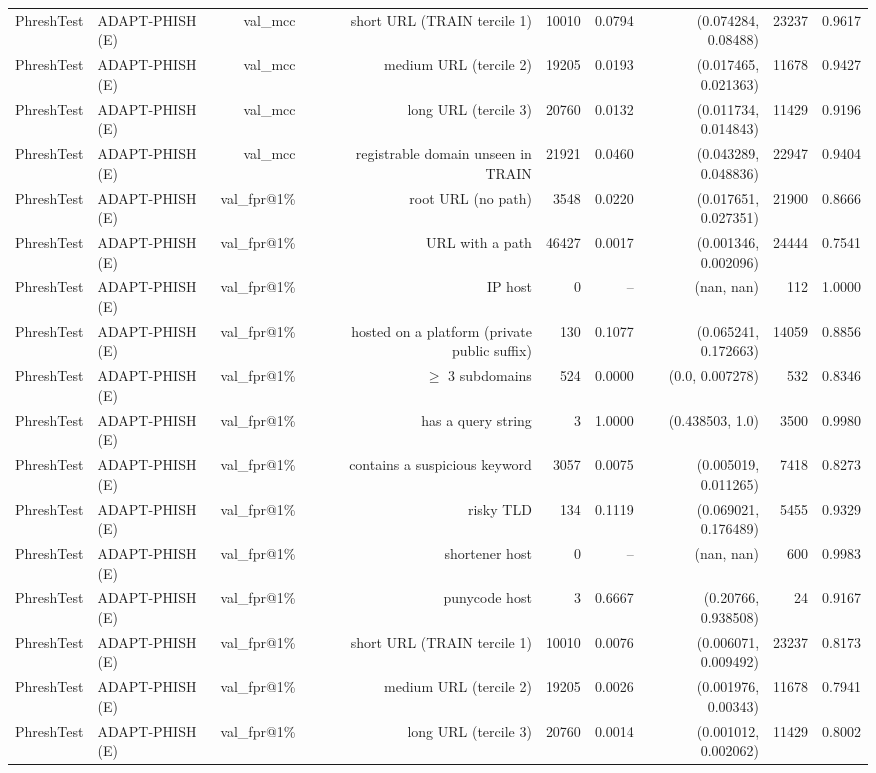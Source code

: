 \begin{table}[t]
\begin{tabular}{llrrrrrrr}
PhreshTest & ADAPT-PHISH (E) & val\_mcc & short URL (TRAIN tercile 1) & 10010 & 0.0794 & (0.074284, 0.08488) & 23237 & 0.9617 \\
PhreshTest & ADAPT-PHISH (E) & val\_mcc & medium URL (tercile 2) & 19205 & 0.0193 & (0.017465, 0.021363) & 11678 & 0.9427 \\
PhreshTest & ADAPT-PHISH (E) & val\_mcc & long URL (tercile 3) & 20760 & 0.0132 & (0.011734, 0.014843) & 11429 & 0.9196 \\
PhreshTest & ADAPT-PHISH (E) & val\_mcc & registrable domain unseen in TRAIN & 21921 & 0.0460 & (0.043289, 0.048836) & 22947 & 0.9404 \\
PhreshTest & ADAPT-PHISH (E) & val\_fpr@1\% & root URL (no path) & 3548 & 0.0220 & (0.017651, 0.027351) & 21900 & 0.8666 \\
PhreshTest & ADAPT-PHISH (E) & val\_fpr@1\% & URL with a path & 46427 & 0.0017 & (0.001346, 0.002096) & 24444 & 0.7541 \\
PhreshTest & ADAPT-PHISH (E) & val\_fpr@1\% & IP host & 0 & -- & (nan, nan) & 112 & 1.0000 \\
PhreshTest & ADAPT-PHISH (E) & val\_fpr@1\% & hosted on a platform (private public suffix) & 130 & 0.1077 & (0.065241, 0.172663) & 14059 & 0.8856 \\
PhreshTest & ADAPT-PHISH (E) & val\_fpr@1\% & $\geq$ 3 subdomains & 524 & 0.0000 & (0.0, 0.007278) & 532 & 0.8346 \\
PhreshTest & ADAPT-PHISH (E) & val\_fpr@1\% & has a query string & 3 & 1.0000 & (0.438503, 1.0) & 3500 & 0.9980 \\
PhreshTest & ADAPT-PHISH (E) & val\_fpr@1\% & contains a suspicious keyword & 3057 & 0.0075 & (0.005019, 0.011265) & 7418 & 0.8273 \\
PhreshTest & ADAPT-PHISH (E) & val\_fpr@1\% & risky TLD & 134 & 0.1119 & (0.069021, 0.176489) & 5455 & 0.9329 \\
PhreshTest & ADAPT-PHISH (E) & val\_fpr@1\% & shortener host & 0 & -- & (nan, nan) & 600 & 0.9983 \\
PhreshTest & ADAPT-PHISH (E) & val\_fpr@1\% & punycode host & 3 & 0.6667 & (0.20766, 0.938508) & 24 & 0.9167 \\
PhreshTest & ADAPT-PHISH (E) & val\_fpr@1\% & short URL (TRAIN tercile 1) & 10010 & 0.0076 & (0.006071, 0.009492) & 23237 & 0.8173 \\
PhreshTest & ADAPT-PHISH (E) & val\_fpr@1\% & medium URL (tercile 2) & 19205 & 0.0026 & (0.001976, 0.00343) & 11678 & 0.7941 \\
PhreshTest & ADAPT-PHISH (E) & val\_fpr@1\% & long URL (tercile 3) & 20760 & 0.0014 & (0.001012, 0.002062) & 11429 & 0.8002 \\

\end{tabular}
\end{table}
